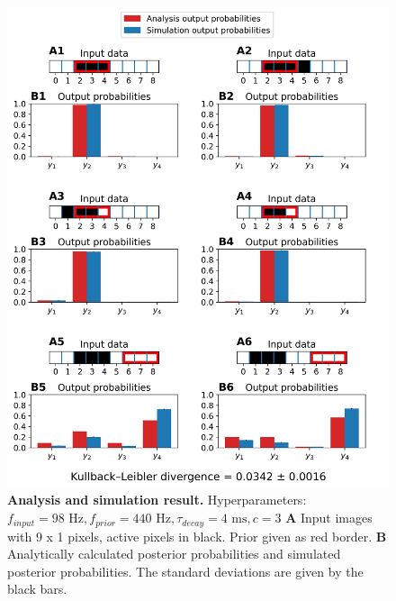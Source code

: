 \begin{figure}
  \includegraphics[width=\linewidth]{figures/1D/training/trainingEvaluation_98_440_4_c3.png}
      \caption{\textbf{Analysis and simulation result. } Hyperparameters: $f_{input} = 98\text{ Hz}, f_{prior} = 440\text{ Hz}, \tau_{decay} = 4\text{ ms}, c = 3$ \textbf{A} Input images with 9 x 1 pixels, active pixels in black. Prior given as red border. \textbf{B} Analytically calculated posterior probabilities and simulated posterior probabilities. The standard deviations are given by the black bars.}  
  \label{fig:1DTrainingEvaluationC3}
\end{figure}

